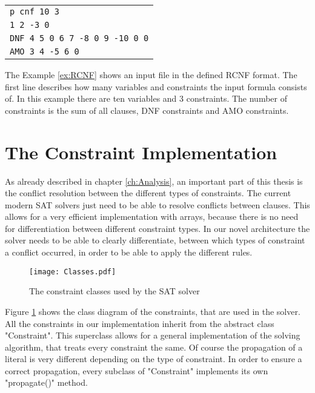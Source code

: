\begin{center}
\begin{leftbar}
\begin{tabular}{l}
\texttt{p cnf 10 3} \\
\texttt{1 2 -3 0} \\
\texttt{DNF 4 5 0 6 7 -8 0 9 -10 0 0}\\
\texttt{AMO 3 4 -5 6 0} \\
\end{tabular}
\end{leftbar}
\label{ex:RCNF}
\end{center}

The Example \ref{ex:RCNF} shows an input file in the defined RCNF format. The first line describes how many variables and constraints the input formula consists of. In this example there are ten variables and 3 constraints. The number of constraints is the sum of all clauses, DNF constraints and AMO constraints.

\section{The Constraint Implementation}

As already described in chapter \ref{ch:Analysis}, an important part of this thesis is the conflict resolution between the different types of constraints. The current modern SAT solvers just need to be able to resolve conflicts between clauses. This allows for a very efficient implementation with arrays, because there is no need for differentiation between different constraint types. In our novel architecture the solver needs to be able to clearly differentiate, between which types of constraint a conflict occurred, in order to be able to apply the different rules.

\begin{figure}[htbp]
  \centering
  \texttt{[image: Classes.pdf]}
  \caption{The constraint classes used by the SAT solver}
  \label{fig:constraints}
\end{figure}

Figure \ref{fig:constraints} shows the class diagram of the constraints, that are used in the solver. All the constraints in our implementation inherit from the abstract class "Constraint". This superclass allows for a general implementation of the solving algorithm, that treats every constraint the same. Of course the propagation of a literal is very different depending on the type of constraint. In order to ensure a correct propagation, every subclass of "Constraint" implements its own "propagate()" method.

